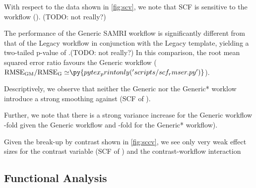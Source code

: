With respect to the data shown in \cref{fig:scv}, we note that SCF is sensitive to
the workflow (). (TODO: not really?)

The performance of the Generic SAMRI workflow is significantly different from that of the Legacy workflow in conjunction with the Legacy template, yielding a two-tailed p-value of .(TODO: not really?)
In this comparison, the root mean squared error ratio favours the Generic workflow ($\mathrm{RMSE_{GM}/RMSE_{G}\simeq} \py{pytex_printonly('scripts/scf_rmser.py')}$).

Descriptively, we observe that neither the Generic nor the Generic* worklow introduce a strong smoothing
against
(SCF of ).

Further, we note that there is a strong variance increase for the Generic workflow
-fold given the Generic workflow and
-fold for the Generic* workflow).

Given the break-up by contrast shown in \cref{fig:sccv}, we see only very weak effect sizes for the contrast variable
(SCF of )
and the contrast-workflow interaction

\subsection{Functional Analysis}

